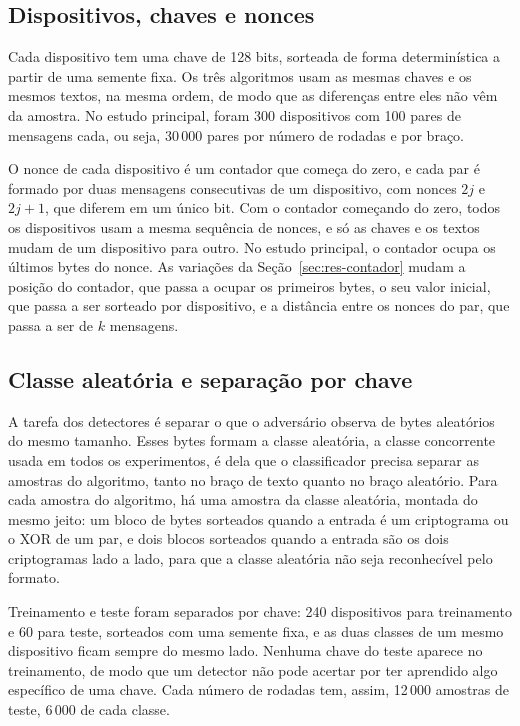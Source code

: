 \subsection{Dispositivos, chaves e nonces}
\label{sec:met-dispositivos}

Cada dispositivo tem uma chave de 128 bits, sorteada de forma determinística a partir de uma semente fixa. Os três algoritmos usam as mesmas chaves e os mesmos textos, na mesma ordem, de modo que as diferenças entre eles não vêm da amostra. No estudo principal, foram 300 dispositivos com 100 pares de mensagens cada, ou seja, 30\,000 pares por número de rodadas e por braço.

O nonce de cada dispositivo é um contador que começa do zero, e cada par é formado por duas mensagens consecutivas de um dispositivo, com nonces $2j$ e $2j+1$, que diferem em um único bit. Com o contador começando do zero, todos os dispositivos usam a mesma sequência de nonces, e só as chaves e os textos mudam de um dispositivo para outro. No estudo principal, o contador ocupa os últimos bytes do nonce. As variações da Seção~\ref{sec:res-contador} mudam a posição do contador, que passa a ocupar os primeiros bytes, o seu valor inicial, que passa a ser sorteado por dispositivo, e a distância entre os nonces do par, que passa a ser de $k$ mensagens.

\subsection{Classe aleatória e separação por chave}
\label{sec:met-separacao}

A tarefa dos detectores é separar o que o adversário observa de bytes aleatórios do mesmo tamanho. Esses bytes formam a classe aleatória, a classe concorrente usada em todos os experimentos, é dela que o classificador precisa separar as amostras do algoritmo, tanto no braço de texto quanto no braço aleatório. Para cada amostra do algoritmo, há uma amostra da classe aleatória, montada do mesmo jeito: um bloco de bytes sorteados quando a entrada é um criptograma ou o XOR de um par, e dois blocos sorteados quando a entrada são os dois criptogramas lado a lado, para que a classe aleatória não seja reconhecível pelo formato.

Treinamento e teste foram separados por chave: 240 dispositivos para treinamento e 60 para teste, sorteados com uma semente fixa, e as duas classes de um mesmo dispositivo ficam sempre do mesmo lado. Nenhuma chave do teste aparece no treinamento, de modo que um detector não pode acertar por ter aprendido algo específico de uma chave. Cada número de rodadas tem, assim, 12\,000 amostras de teste, 6\,000 de cada classe.


